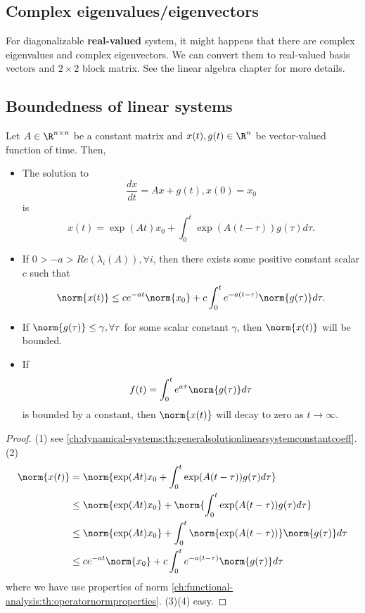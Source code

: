 \begin{refsection}
\subsection{Complex eigenvalues/eigenvectors}
For diagonalizable \textbf{real-valued }system, it might happens that there are complex eigenvalues and complex eigenvectors. We can convert them to real-valued basis vectors and $2\times 2$ block matrix. See the linear algebra chapter for more details.


\subsection{Boundedness  of linear systems}


\begin{lemma}\cite[344]{chirikjianstochastic}
Let $A\in \R^{n\times n}$ be a constant matrix and $x(t),g(t)\in\R^n$ be vector-valued function of time. Then,
\begin{itemize}
	\item The solution to 
	$$\frac{dx}{dt} = Ax + g(t), x(0) = x_0$$
	is
	$$x(t) = \exp(At)x_0 + \int_0^t \exp(A(t-\tau))g(\tau)d\tau.$$
	\item If $0>-a>Re(\lambda_i(A)),\forall i$, then there exists some positive constant scalar $c$ such that
	$$\norm{x(t)} \leq ce^{-at}\norm{x_0} + c\int_0^t e^{-a(t-\tau)}\norm{g(\tau)}d\tau.$$
	\item If $\norm{g(\tau)}\leq \gamma,\forall \tau$ for some scalar constant $\gamma$, then $\norm{x(t)}$ will be bounded.
	\item If $$f(t) = \int_0^t e^{a\tau} \norm{g(\tau)} d\tau$$
	is bounded by a constant, then $\norm{x(t)}$ will decay to zero as $t\to \infty$.
\end{itemize}
\end{lemma}
\begin{proof}
(1) see \autoref{ch:dynamical-systems:th:generalsolutionlinearsystemconstantcoeff}. (2)
	\begin{align*}
	\norm{x(t)} &= \norm{\exp(At)x_0 + \int_0^t \exp(A(t-\tau))g(\tau)d\tau} \\
	&\leq \norm{\exp(At)x_0} + \norm{\int_0^t \exp(A(t-\tau))g(\tau)d\tau} \\
	&\leq \norm{\exp(At)x_0} + \int_0^t\norm{ \exp(A(t-\tau))}\norm{g(\tau)}d\tau \\
    &\leq ce^{-at}\norm{x_0} + c\int_0^t e^{-a(t-\tau)}\norm{g(\tau)}d\tau
	\end{align*}
where we have use properties of norm \autoref{ch:functional-analysis:th:operatornormproperties}. 
(3)(4) easy.
\end{proof}


\end{refsection}
